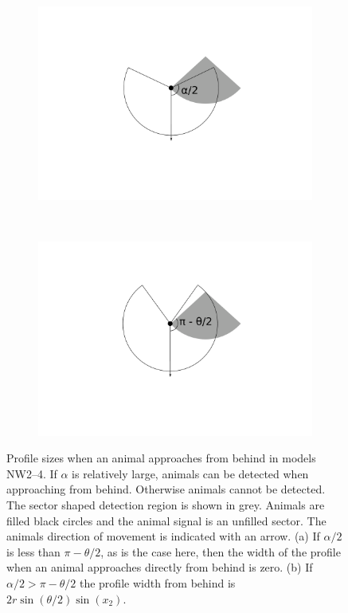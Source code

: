 \begin{figure}[t]
        \centering
        \begin{subfigure}[t]{0.35\textwidth}
                \centering
        \includegraphics[width=1\textwidth, trim=5cm 6cm 4cm 1cm]{imgs/behind.pdf}
                \label{f:NW2--4behind}
                \caption{}
        \end{subfigure}
~ 
        \begin{subfigure}[t]{0.35\textwidth}
                \centering
        \includegraphics[width=1\textwidth, trim=5cm 6cm 4cm 1cm]{imgs/behind2.pdf}
                \label{f:NW2--4behind2}
                \caption{}
        \end{subfigure}

\caption{Profile sizes when an animal approaches from behind in models NW2--4. If $\alpha$ is relatively large, animals can be detected when approaching from behind. Otherwise animals cannot be detected.  The sector shaped detection region is shown in grey. Animals are filled black circles and the animal signal is an unfilled sector. The animals direction of movement is indicated with an arrow.  (a) If $\alpha/2$ is less than $\pi - \theta/2$, as is the case here, then the width of the profile when an animal approaches directly from behind is zero. (b) If $\alpha/2 > \pi - \theta/2$ the profile width from behind is $2r\sin\left(\theta/2\right)\sin(x_2)$.}
\label{f:NW2--4}
\end{figure}


